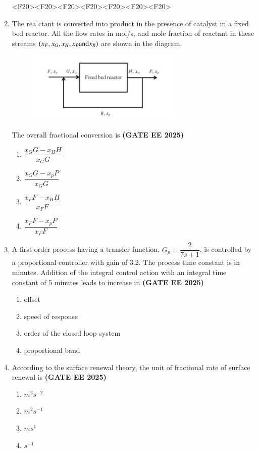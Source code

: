 \documentclass[journal,12pt,onecolumn]{IEEEtran}
\theoremstyle{remark}
\begin{document}
\begin{enumerate}
<F20><F20><F20><F20><F20><F20><F20>
\item  The rea
ctant is converted into product  in the presence of catalyst in a fixed bed reactor. All the flow rates  in mol/s, and mole fraction of reactant  in these streams $\left(x_F, x_G, x_H, x_P \text{and} x_R\right)$ are shown in the diagram.
\begin{figure}
\begin{center}
\includegraphics[width=0.7\textwidth]{figs/17.png}
      \caption{}
      \label{fig17}
\end{center}
\end{figure}
The overall fractional conversion is
\hfill \textbf{(GATE EE 2025)} \begin{enumerate}
    \item $\dfrac{x_{G}G-x_{H}H}{x_{G}G}$
    \item $\dfrac{x_{G}G-x_{p}P}{x_{G}G}$
    \item $\dfrac{x_{F}F-x_{H}H}{x_{F}F}$
    \item $\dfrac{x_{F}F-x_{p}P}{x_{F}F}$
\end{enumerate}


\item A first-order process having a transfer function, $G_{p}=\dfrac{2}{7s+1}$, is controlled by a proportional controller with gain of 3.2. The process time constant is in minutes. Addition of the integral control action with an integral time constant of 5 minutes leads to increase in
\hfill \textbf{(GATE EE 2025)} \begin{enumerate}
    \item offset
    \item speed of response
    \item order of the closed loop system
    \item proportional band
\end{enumerate}


\item According to the surface renewal theory, the unit of fractional rate of surface renewal is
\hfill \textbf{(GATE EE 2025)} \begin{enumerate}
    \item $m^{2}s^{-2}$
    \item $m^{2}s^{-1}$
    \item $ms^{1}$
    \item $s^{-1}$
\end{enumerate}



\end{enumerate}
\end{document}

